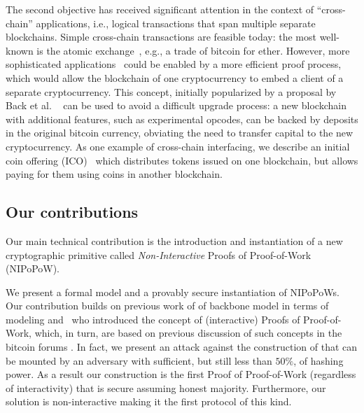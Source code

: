 %
The second objective has received  significant attention in the context of
``cross-chain'' applications, i.e., logical transactions that span multiple
separate blockchains. Simple cross-chain transactions are feasible today: the
most well-known is the atomic exchange~\cite{tiernolan,herlihy2018atomic}, e.g.,
a trade of bitcoin for ether. However, more sophisticated
applications~
\cite{interledger,DBLP:journals/corr/DilleyPWPGF16,
      lerner,drivechains,wood2016polkadot,buchman2016tendermint}
could be enabled by a more efficient proof process, which would allow the
blockchain of one cryptocurrency to embed a client of a separate cryptocurrency.
This concept, initially popularized by a proposal by Back et al.
~\cite{sidechains} can be used to avoid a difficult upgrade process: a new
blockchain with additional features, such as experimental opcodes, can be backed
by deposits in the original bitcoin currency, obviating the need to transfer
capital to the new cryptocurrency. As one example of cross-chain interfacing, we
describe an initial coin offering (ICO)~\cite{ico} which distributes tokens
issued on one blockchain, but allows paying for them using coins in another
blockchain.


\subsection{Our contributions}
Our main technical contribution is the introduction and instantiation of a new
cryptographic primitive called \textit{Non-Interactive} Proofs of Proof-of-Work
(NIPoPoW).

We present a formal model and a provably secure instantiation of NIPoPoWs. Our contribution builds on previous work  of
of
backbone model \cite{backbone} in terms of modeling and~\cite{KLS} who introduced the concept of (interactive) Proofs of Proof-of-Work,
which, in turn, are based on previous discussion of such concepts in the bitcoin
forums \cite{highway}. In fact, we present an attack against the
construction of \cite{KLS} that can be mounted by an adversary with sufficient, but still less than $50\%$, of hashing power.
As a result  our construction is the first Proof
of Proof-of-Work (regardless of interactivity) that is secure assuming honest majority.
Furthermore, our solution is non-interactive making it the first protocol
of this kind.

